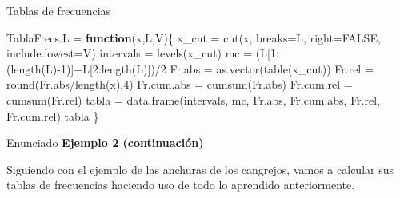 \documentclass[
  ignorenonframetext,
  aspectratio=169]{beamer}
\newenvironment{Shaded}{\begin{snugshade}}{\end{snugshade}}
\newcommand{\AttributeTok}[1]{\textcolor[rgb]{0.77,0.63,0.00}{#1}}
\newcommand{\ConstantTok}[1]{\textcolor[rgb]{0.00,0.00,0.00}{#1}}
\newcommand{\ControlFlowTok}[1]{\textcolor[rgb]{0.13,0.29,0.53}{\textbf{#1}}}
\newcommand{\DecValTok}[1]{\textcolor[rgb]{0.00,0.00,0.81}{#1}}
\newcommand{\FunctionTok}[1]{\textcolor[rgb]{0.00,0.00,0.00}{#1}}
\newcommand{\NormalTok}[1]{#1}
\newcommand{\OtherTok}[1]{\textcolor[rgb]{0.56,0.35,0.01}{#1}}
\newcommand{\SpecialCharTok}[1]{\textcolor[rgb]{0.00,0.00,0.00}{#1}}
\begin{document}
\begin{frame}[fragile]{Tablas de frecuencias}
\protect\hypertarget{tablas-de-frecuencias}{}
\begin{Shaded}
\begin{Highlighting}[]
\NormalTok{TablaFrecs.L }\OtherTok{=} \ControlFlowTok{function}\NormalTok{(x,L,V)\{}
\NormalTok{  x\_cut }\OtherTok{=} \FunctionTok{cut}\NormalTok{(x, }\AttributeTok{breaks=}\NormalTok{L, }\AttributeTok{right=}\ConstantTok{FALSE}\NormalTok{, }\AttributeTok{include.lowest=}\NormalTok{V)}
\NormalTok{  intervals }\OtherTok{=} \FunctionTok{levels}\NormalTok{(x\_cut)}
\NormalTok{  mc }\OtherTok{=}\NormalTok{ (L[}\DecValTok{1}\SpecialCharTok{:}\NormalTok{(}\FunctionTok{length}\NormalTok{(L)}\SpecialCharTok{{-}}\DecValTok{1}\NormalTok{)]}\SpecialCharTok{+}\NormalTok{L[}\DecValTok{2}\SpecialCharTok{:}\FunctionTok{length}\NormalTok{(L)])}\SpecialCharTok{/}\DecValTok{2}
\NormalTok{  Fr.abs }\OtherTok{=} \FunctionTok{as.vector}\NormalTok{(}\FunctionTok{table}\NormalTok{(x\_cut)) }
\NormalTok{  Fr.rel }\OtherTok{=} \FunctionTok{round}\NormalTok{(Fr.abs}\SpecialCharTok{/}\FunctionTok{length}\NormalTok{(x),}\DecValTok{4}\NormalTok{)}
\NormalTok{  Fr.cum.abs }\OtherTok{=} \FunctionTok{cumsum}\NormalTok{(Fr.abs)}
\NormalTok{  Fr.cum.rel }\OtherTok{=} \FunctionTok{cumsum}\NormalTok{(Fr.rel)}
\NormalTok{  tabla }\OtherTok{=} \FunctionTok{data.frame}\NormalTok{(intervals, mc, Fr.abs, Fr.cum.abs, Fr.rel, Fr.cum.rel)}
\NormalTok{  tabla}
\NormalTok{  \}}
\end{Highlighting}
\end{Shaded}
\end{frame}

\begin{frame}{Enunciado}
\protect\hypertarget{enunciado}{}
\textbf{Ejemplo 2 (continuación)}

Siguiendo con el ejemplo de las anchuras de los cangrejos, vamos a
calcular sus tablas de frecuencias haciendo uso de todo lo aprendido
anteriormente.
\end{frame}
\end{document}
